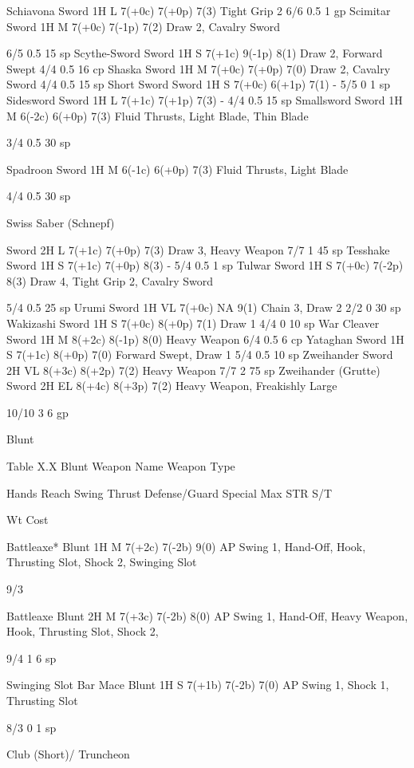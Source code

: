 \documentclass[oneside,11pt,english]{book}
\begin{document}
Schiavona Sword 1H L 7(+0c) 7(+0p) 7(3) Tight Grip 2 6/6 0.5 1 gp 
Scimitar Sword 1H M 7(+0c) 7(-1p) 7(2) Draw 2, 
Cavalry Sword 

6/5 0.5 15 
sp 
Scythe-Sword Sword 1H S 7(+1c) 9(-1p) 8(1) Draw 2, Forward Swept 4/4 0.5 16 
cp 
Shaska Sword 1H M 7(+0c) 7(+0p) 7(0) Draw 2, Cavalry Sword 4/4 0.5 15 
sp 
Short Sword Sword 1H S 7(+0c) 6(+1p) 7(1) - 5/5 0 1 sp 
Sidesword Sword 1H L 7(+1c) 7(+1p) 7(3) - 4/4 0.5 15 
sp 
Smallsword Sword 1H M 6(-2c) 6(+0p) 7(3) Fluid Thrusts, Light 
Blade, Thin Blade 

3/4 0.5 30 
sp 

Spadroon Sword 1H M 6(-1c) 6(+0p) 7(3) Fluid Thrusts, Light 
Blade 

4/4 0.5 30 
sp 

Swiss Saber 
(Schnepf) 

Sword 2H L 7(+1c) 7(+0p) 7(3) Draw 3, Heavy Weapon 7/7 1 45 
sp 
Tesshake Sword 1H S 7(+1c) 7(+0p) 8(3) - 5/4 0.5 1 sp 
Tulwar Sword 1H S 7(+0c) 7(-2p) 8(3) Draw 4, Tight Grip 2, 
Cavalry Sword 

5/4 0.5 25 
sp 
Urumi Sword 1H VL 7(+0c) NA 9(1) Chain 3, Draw 2 2/2 0 30 
sp 
Wakizashi Sword 1H S 7(+0c) 8(+0p) 7(1) Draw 1 4/4 0 10 
sp 
War Cleaver Sword 1H M 8(+2c) 8(-1p) 8(0) Heavy Weapon 6/4 0.5 6 cp 
Yataghan Sword 1H S 7(+1c) 8(+0p) 7(0) Forward Swept, Draw 1 5/4 0.5 10 
sp 
Zweihander Sword 2H VL 8(+3c) 8(+2p) 7(2) Heavy Weapon 7/7 2 75 
sp 
Zweihander (Grutte) Sword 2H EL 8(+4c) 8(+3p) 7(2) Heavy Weapon, 
Freakishly Large 

10/10 3 6 gp 

 

Blunt 

 
Table X.X Blunt 
Weapon Name Weapon 
Type 

Hands Reach Swing Thrust Defense/Guard Special Max 
STR 
S/T 

Wt Cost 

Battleaxe* Blunt 1H M 7(+2c) 7(-2b) 9(0) AP Swing 1, Hand-Off, 
Hook, Thrusting Slot, 
Shock 2, Swinging Slot 

9/3 

Battleaxe Blunt 2H M 7(+3c) 7(-2b) 8(0) AP Swing 1, Hand-Off, 
Heavy Weapon, Hook, 
Thrusting Slot, Shock 2, 

9/4 1 6 sp 


Swinging Slot 
Bar Mace Blunt 1H S 7(+1b) 7(-2b) 7(0) AP Swing 1, Shock 1, 
Thrusting Slot 

8/3 0 1 sp 

Club (Short)/ 
Truncheon 
\end{document}
